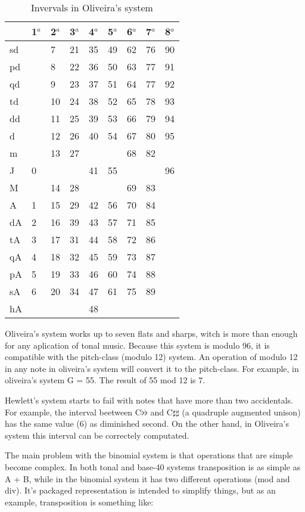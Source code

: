\documentclass{article}
\begin{document}
\begin{table}
  \centering
  \begin{tabular}{l|llllllll}
    & 1$^{a}$& 2$^{a}$& 3$^{a}$& 4$^{a}$& 5$^{a}$& 6$^{a}$& 7$^{a}$& 8$^{a}$ \\
    \hline
    sd  &  & 7&21&35&49&62&76&90 \\
    pd  &  & 8&22&36&50&63&77&91 \\
    qd  &  & 9&23&37&51&64&77&92 \\
    td  &  &10&24&38&52&65&78&93 \\
    dd  &  &11&25&39&53&66&79&94 \\
    d   &  &12&26&40&54&67&80&95 \\
    m   &  &13&27&  &  &68&82&   \\
    J   & 0&  &  &41&55&  &  &96 \\
    M   &  &14&28&  &  &69&83&   \\
    A   & 1&15&29&42&56&70&84&   \\
    dA  & 2&16&39&43&57&71&85&   \\
    tA  & 3&17&31&44&58&72&86&   \\
    qA  & 4&18&32&45&59&73&87&   \\
    pA  & 5&19&33&46&60&74&88&   \\
    sA  & 6&20&34&47&61&75&89&   \\
    hA  &  &  &  &48&  &  &  &   
  \end{tabular}
  \caption{Invervals in Oliveira's system}
  \label{tab:jama-intervalos}
\end{table}

Oliveira's system works up to seven flats and sharps, witch is more
than enough for any aplication of tonal music. Because this system is
modulo 96, it is compatible with the pitch-class (modulo 12) system.
An operation of modulo 12 in any note in oliveira's system will
convert it to the pitch-class. For example, in oliveira's system G =
55. The result of 55 mod 12 is 7.

Hewlett's system starts to fail with notes that have more than two
accidentals. For example, the interval beetween C$\flat\flat$ and
C$\sharp\sharp$ (a quadruple augmented unison) has the same value (6)
as diminished second. On the other hand, in Oliveira's system this
interval can be correctely computated.

The main problem with the binomial system is that operations that are
simple become complex. In both tonal and base-40 systems transposition
is as simple as A + B, while in the binomial system it has two
different operations (mod and div). It's packaged representation is
intended to simplify things, but as an example, transposition is
something like:
\end{document}
